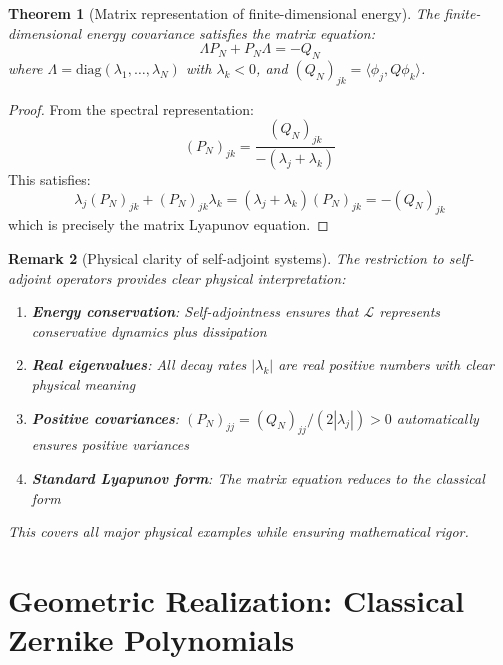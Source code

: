 \documentclass[a4paper,12pt]{article}
\newtheorem{theorem}{Theorem}[section]
\newtheorem{remark}[theorem]{Remark}
\newcommand{\inner}[2]{\langle #1, #2 \rangle}
\begin{document}
\begin{theorem}[Matrix representation of finite-dimensional energy]\label{thm:matrix_energy}
The finite-dimensional energy covariance satisfies the matrix equation:
\begin{equation}\label{eq:matrix_lyapunov}
\Lambda P_N + P_N \Lambda = -Q_N
\end{equation}
where $\Lambda = \text{diag}(\lambda_1, \ldots, \lambda_N)$ with $\lambda_k < 0$, and $(Q_N)_{jk} = \inner{\phi_j}{Q\phi_k}$.
\end{theorem}

\begin{proof}
From the spectral representation:
\begin{equation}
(P_N)_{jk} = \frac{(Q_N)_{jk}}{-(\lambda_j + \lambda_k)}
\end{equation}
This satisfies:
\begin{equation}
\lambda_j (P_N)_{jk} + (P_N)_{jk} \lambda_k = (\lambda_j + \lambda_k)(P_N)_{jk} = -(Q_N)_{jk}
\end{equation}
which is precisely the matrix Lyapunov equation.
\end{proof}

\begin{remark}[Physical clarity of self-adjoint systems]\label{rem:physical_clarity}
The restriction to self-adjoint operators provides clear physical interpretation:
\begin{enumerate}
\item \textbf{Energy conservation}: Self-adjointness ensures that $\mathcal{L}$ represents conservative dynamics plus dissipation
\item \textbf{Real eigenvalues}: All decay rates $|\lambda_k|$ are real positive numbers with clear physical meaning
\item \textbf{Positive covariances}: $(P_N)_{jj} = (Q_N)_{jj}/(2|\lambda_j|) > 0$ automatically ensures positive variances
\item \textbf{Standard Lyapunov form}: The matrix equation reduces to the classical form
\end{enumerate}
This covers all major physical examples while ensuring mathematical rigor.
\end{remark}

\section{Geometric Realization: Classical Zernike Polynomials}\label{sec:zernike}
\end{document}
